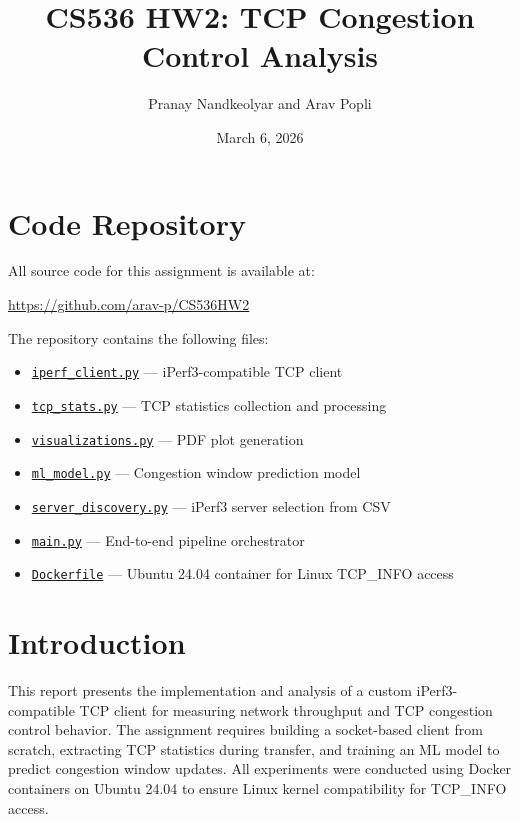 \documentclass[11pt]{article}
\title{CS536 HW2: TCP Congestion Control Analysis}
\author{Pranay Nandkeolyar and Arav Popli}
\date{March 6, 2026}
\begin{document}
\maketitle

\section{Code Repository}

All source code for this assignment is available at:

\begin{center}
    \url{https://github.com/arav-p/CS536HW2}
\end{center}

The repository contains the following files:
\begin{itemize}
    \item \href{https://github.com/arav-p/CS536HW2/blob/main/iperf_client.py}{\texttt{iperf\_client.py}} — iPerf3-compatible TCP client
    \item \href{https://github.com/arav-p/CS536HW2/blob/main/tcp_stats.py}{\texttt{tcp\_stats.py}} — TCP statistics collection and processing
    \item \href{https://github.com/arav-p/CS536HW2/blob/main/visualizations.py}{\texttt{visualizations.py}} — PDF plot generation
    \item \href{https://github.com/arav-p/CS536HW2/blob/main/ml_model.py}{\texttt{ml\_model.py}} — Congestion window prediction model
    \item \href{https://github.com/arav-p/CS536HW2/blob/main/server_discovery.py}{\texttt{server\_discovery.py}} — iPerf3 server selection from CSV
    \item \href{https://github.com/arav-p/CS536HW2/blob/main/main.py}{\texttt{main.py}} — End-to-end pipeline orchestrator
    \item \href{https://github.com/arav-p/CS536HW2/blob/main/Dockerfile}{\texttt{Dockerfile}} — Ubuntu 24.04 container for Linux TCP\_INFO access
\end{itemize}


\section{Introduction}

This report presents the implementation and analysis of a custom iPerf3-compatible TCP client for measuring network throughput and TCP congestion control behavior. The assignment requires building a socket-based client from scratch, extracting TCP statistics during transfer, and training an ML model to predict congestion window updates. All experiments were conducted using Docker containers on Ubuntu 24.04 to ensure Linux kernel compatibility for TCP\_INFO access.
\end{document}
